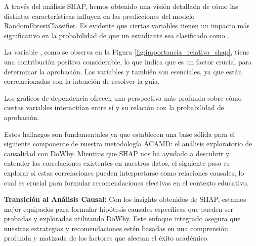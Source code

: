 A través del análisis SHAP, hemos obtenido una visión detallada de cómo las distintas características influyen en las predicciones del modelo RandomForestClassifier. Es evidente que ciertas variables tienen un impacto más significativo en la probabilidad de que un estudiante sea clasificado como \textit{}.

La variable , como se observa en la Figura \ref{fig:importancia_relativa_shap}, tiene una contribución positiva considerable, lo que indica que es un factor crucial para determinar la aprobación. Las variables  y  también son esenciales, ya que están correlacionadas con la intención de resolver la guía.

Los gráficos de dependencia ofrecen una perspectiva más profunda sobre cómo ciertas variables interactúan entre sí y su relación con la probabilidad de aprobación.

Estos hallazgos son fundamentales ya que establecen una base sólida para el siguiente componente de nuestra metodología ACAMD: el análisis exploratorio de causalidad con DoWhy. Mientras que SHAP nos ha ayudado a descubrir y entender las correlaciones existentes en nuestros datos, el siguiente paso es explorar si estas correlaciones pueden interpretarse como relaciones causales, lo cual es crucial para formular recomendaciones efectivas en el contexto educativo.

\textbf{Transición al Análisis Causal:} Con los insights obtenidos de SHAP, estamos mejor equipados para formular hipótesis causales específicas que pueden ser probadas y exploradas utilizando DoWhy. Este enfoque integrado asegura que nuestras estrategias y recomendaciones estén basadas en una comprensión profunda y matizada de los factores que afectan el éxito académico.